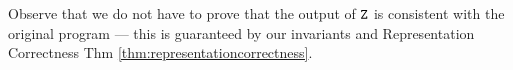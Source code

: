\documentclass[10pt]{proc}
\numberwithin{equation}{section}
\renewcommand{\tt}[1]{\ifmmode\text{\texttt{#1}}\else\texttt{#1}\fi}
\begin{document}
Observe that we do not have to prove that the output of $\tt{Z}$ is consistent with the original program --- this is guaranteed by our invariants and Representation Correctness Thm \ref{thm:representationcorrectness}.





\end{document}

